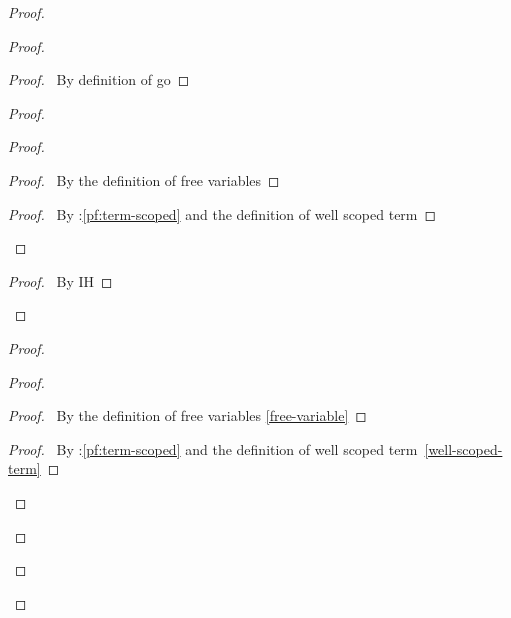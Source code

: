 \documentclass[a4paper]{article}
\begin{document}
\begin{proof}
\begin{proof}
    \begin{proof}
      \pf\ By definition of \textsf{go}
    \end{proof}
     \label{pf:6-2}
    \begin{proof}
      \begin{proof}
        \begin{proof}
          \pf\ By the definition of free variables
        \end{proof}
        \qedstep
        \begin{proof}
          \pf\ By \toplevel:\ref{pf:term-scoped} and the definition of well scoped term
        \end{proof}
      \end{proof}
      \qedstep
      \begin{proof}
        \pf\ By IH
      \end{proof}
    \end{proof}
    \begin{proof}
      \begin{proof}
        \begin{proof}
          \pf\ By the definition of free variables \ref{free-variable}
        \end{proof}
        \qedstep
        \begin{proof}
          \pf\ By \toplevel:\ref{pf:term-scoped} and the definition of well scoped term~\ref{well-scoped-term}
        \end{proof}
      \end{proof}

\end{proof}
\end{proof}
\end{proof}
\end{document}
